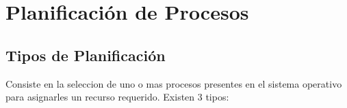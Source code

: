 \documentclass[12pt, fleqn]{report}                             %
\begin{document}
        \clearpage
        \section{Planificación de Procesos}



            \subsection{Tipos de Planificación}

                Consiste en la seleccion de uno o mas procesos presentes en el sistema operativo para asignarles
                un recurso requerido. Existen 3 tipos:
\end{document}
